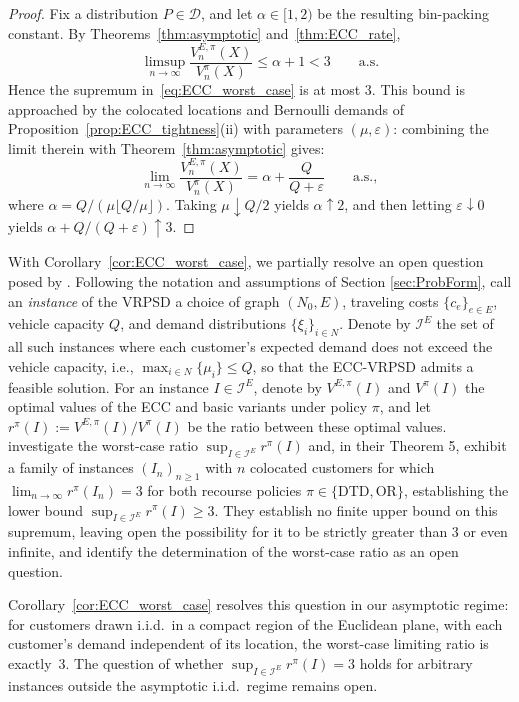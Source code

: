 \documentclass{article}
\begin{document}
{\begin{proof}
Fix a distribution $P \in \mathcal{D}$, and let $\alpha \in [1,2)$ be the resulting bin-packing constant. By Theorems~\ref{thm:asymptotic} and~\ref{thm:ECC_rate},
\[
    \limsup_{n \to \infty} \frac{V^{E,\pi}_n(X)}{V^\pi_n(X)} \le \alpha + 1 < 3
    \qquad \text{a.s.}
\]
Hence the supremum in~\eqref{eq:ECC_worst_case} is at most $3$. This bound is approached by the colocated locations and Bernoulli demands of Proposition~\ref{prop:ECC_tightness}(ii) with parameters $(\mu,\varepsilon)$: combining the limit therein with Theorem~\ref{thm:asymptotic} gives:
\[
\lim_{n\to\infty}\frac{V^{E,\pi}_n(X)}{V^\pi_n(X)}
=
\alpha + \frac{Q}{Q+\varepsilon}
\qquad \text{a.s.},
\]
where $\alpha = Q/(\mu \lfloor Q/\mu \rfloor)$. Taking $\mu \downarrow Q/2$ yields $\alpha \uparrow 2$, and then letting $\varepsilon \downarrow 0$ yields $\alpha + Q/(Q+\varepsilon) \uparrow 3$.
\end{proof}

With Corollary~\ref{cor:ECC_worst_case}, we partially resolve an open question posed by \cite{hoogendoorn2025evaluation}. Following the notation and assumptions of Section \ref{sec:ProbForm}, call an \emph{instance} of the VRPSD a choice of graph $(N_0,E)$, traveling costs $\{c_e\}_{e \in E}$, vehicle capacity $Q$, and demand distributions $\{\xi_i\}_{i \in N}$. Denote by $\mathcal{I}^E$ the set of all such instances where each customer's expected demand does not exceed the vehicle capacity, i.e., $\max_{i \in N}\{\mu_i\} \leq Q$, so that the ECC-VRPSD admits a feasible solution. For an instance $I \in \mathcal{I}^E$, denote by $V^{E,\pi}(I)$ and $V^{\pi}(I)$ the optimal values of the ECC and basic variants under policy $\pi$, and let $r^{\pi}(I) := V^{E,\pi}(I) / V^{\pi}(I)$ be the ratio between these optimal values. \cite{hoogendoorn2025evaluation} investigate the worst-case ratio $\sup_{I \in \mathcal{I}^E} r^{\pi}(I)$ and, in their Theorem 5, exhibit a family of instances $(I_n)_{n \geq 1}$ with $n$ colocated customers for which $\lim_{n \to \infty} r^{\pi}(I_n) = 3$ for both recourse policies $\pi \in \{\text{DTD}, \text{OR}\}$, establishing the lower bound $\sup_{I \in \mathcal{I}^E} r^{\pi}(I) \geq 3$. They establish no finite upper bound on this supremum, leaving open the possibility for it to be strictly greater than 3 or even infinite, and identify the determination of the worst-case ratio as an open question.

Corollary~\ref{cor:ECC_worst_case} resolves this question in our asymptotic regime: for customers drawn i.i.d.\ in a compact region of the Euclidean plane, with each customer's demand independent of its location, the worst-case limiting ratio is exactly~$3$. The question of whether $\sup_{I \in \mathcal{I}^E} r^{\pi}(I)=3$ holds for arbitrary instances outside the asymptotic i.i.d.\ regime remains open.
}
\end{document}
